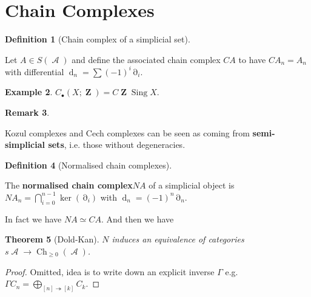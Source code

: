 \documentclass[10pt,]{book}
\newcommand{\terminology}[1]{\textbf{#1}}
\theoremstyle{plain}
\newtheorem{theorem}{Theorem}[section]
\theoremstyle{definition}
\newtheorem{definition}[theorem]{Definition}
\newtheorem{example}[theorem]{Example}
\newtheorem{remark}[theorem]{Remark}
\numberwithin{equation}{section}
\DeclareMathOperator{\Sing}{Sing}
\DeclareMathOperator{\Ch}{Ch}
\DeclareMathOperator{\cA}{\mathcal{A}}
\DeclareMathOperator{\dd}{\partial}
\DeclareMathOperator{\rd}{\mathrm{d}}
\DeclareMathOperator{\ZZ}{\mathbf{Z}}
\begin{document}
\section[Chain Complexes]{Chain Complexes}\label{sec-simp-chain-complexes}
\begin{definition}[Chain complex of a simplicial set]\label{definition-26}

            Let \(A \in S(\cA)\) and define the associated chain complex \(CA\) to have \(CA_n = A_n\) with differential \(\rd_n = \sum (-1)^i \dd_i\).
          \end{definition}
\begin{example}\label{example-18}
\(C_\bullet(X; \ZZ) = C\ZZ\Sing X\).
          \end{example}
\begin{remark}\label{remark-3}

            Kozul complexes and Cech complexes can be seen as coming from \terminology{semi-simplicial sets}, i.e. those without degeneracies.
          \end{remark}
\begin{definition}[Normalised chain complexes]\label{definition-27}

            The \terminology{normalised chain complex}\(NA\) of a simplicial object is \(NA_n = \bigcap_{i=0}^{n-1} \ker(\dd_i)\) with \(\rd_n = (-1)^n \dd_n\). \end{definition}

          In fact we have \(NA \simeq CA\).
          And then we have 
\begin{theorem}[Dold-Kan]\label{theorem-5}
\(N\) induces an equivalence of categories \(s\cA \to \Ch_{\ge 0}(\cA)\).
          \end{theorem}
\begin{proof}
Omitted, idea is to write down an explicit inverse \(\Gamma\) e.g. \(\Gamma C_n = \bigoplus_{[n]\twoheadrightarrow [k]} C_k\).\end{proof}
\typeout{************************************************}
\typeout{************************************************}
\end{document}
